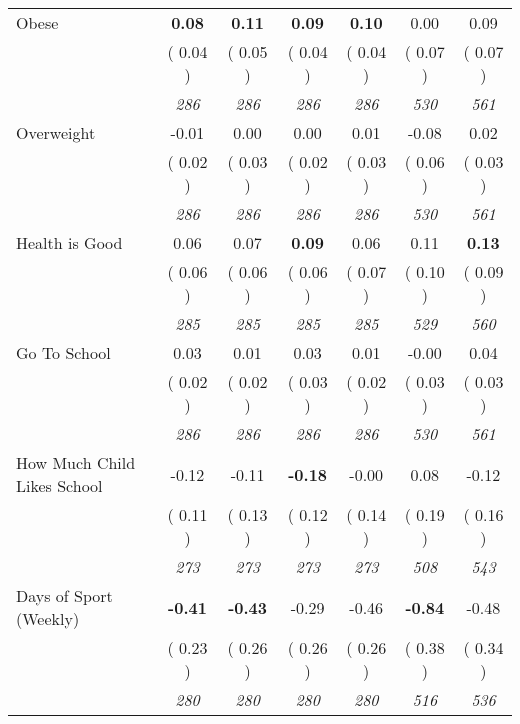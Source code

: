 \begin{tabular}{l c c c c c c}
Obese & \textbf{      0.08 } & \textbf{      0.11 } & \textbf{      0.09 } & \textbf{     0.10} &      0.00 &      0.09 \\
& (     0.04 ) & (     0.05 ) & (     0.04 ) & (     0.04 ) & (     0.07 ) & (     0.07 ) \\
& \textit{ 286 } & \textit{ 286 } & \textit{ 286 } & \textit{ 286 } & \textit{ 530 } & \textit{ 561 } \\
Overweight &     -0.01 &      0.00 &      0.00 &      0.01 &     -0.08 &      0.02 \\
& (     0.02 ) & (     0.03 ) & (     0.02 ) & (     0.03 ) & (     0.06 ) & (     0.03 ) \\
& \textit{ 286 } & \textit{ 286 } & \textit{ 286 } & \textit{ 286 } & \textit{ 530 } & \textit{ 561 } \\
Health is Good &      0.06 &      0.07 & \textbf{      0.09 } &      0.06 &      0.11 & \textbf{      0.13 } \\
& (     0.06 ) & (     0.06 ) & (     0.06 ) & (     0.07 ) & (     0.10 ) & (     0.09 ) \\
& \textit{ 285 } & \textit{ 285 } & \textit{ 285 } & \textit{ 285 } & \textit{ 529 } & \textit{ 560 } \\
Go To School &      0.03 &      0.01 &      0.03 &      0.01 &     -0.00 &      0.04 \\
& (     0.02 ) & (     0.02 ) & (     0.03 ) & (     0.02 ) & (     0.03 ) & (     0.03 ) \\
& \textit{ 286 } & \textit{ 286 } & \textit{ 286 } & \textit{ 286 } & \textit{ 530 } & \textit{ 561 } \\
How Much Child Likes School &     -0.12 &     -0.11 & \textbf{     -0.18 } &     -0.00 &      0.08 &     -0.12 \\
& (     0.11 ) & (     0.13 ) & (     0.12 ) & (     0.14 ) & (     0.19 ) & (     0.16 ) \\
& \textit{ 273 } & \textit{ 273 } & \textit{ 273 } & \textit{ 273 } & \textit{ 508 } & \textit{ 543 } \\
Days of Sport (Weekly) & \textbf{     -0.41 } & \textbf{     -0.43 } &     -0.29 &     -0.46 & \textbf{     -0.84 } &     -0.48 \\
& (     0.23 ) & (     0.26 ) & (     0.26 ) & (     0.26 ) & (     0.38 ) & (     0.34 ) \\
& \textit{ 280 } & \textit{ 280 } & \textit{ 280 } & \textit{ 280 } & \textit{ 516 } & \textit{ 536 } \\
\bottomrule
\end{tabular}
